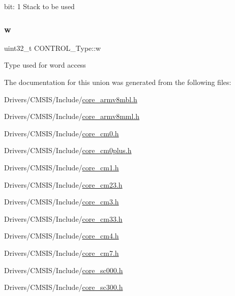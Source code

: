 bit\+: 1 Stack to be used \mbox{\label{union_c_o_n_t_r_o_l___type_a6b642cca3d96da660b1198c133ca2a1f}} 
\subsubsection{\texorpdfstring{w}{w}}
{\footnotesize\ttfamily uint32\+\_\+t C\+O\+N\+T\+R\+O\+L\+\_\+\+Type\+::w}

Type used for word access 

The documentation for this union was generated from the following files\+:\begin{DoxyCompactItemize}
\item 
Drivers/\+C\+M\+S\+I\+S/\+Include/\mbox{\hyperlink{core__armv8mbl_8h}{core\+\_\+armv8mbl.\+h}}\item 
Drivers/\+C\+M\+S\+I\+S/\+Include/\mbox{\hyperlink{core__armv8mml_8h}{core\+\_\+armv8mml.\+h}}\item 
Drivers/\+C\+M\+S\+I\+S/\+Include/\mbox{\hyperlink{core__cm0_8h}{core\+\_\+cm0.\+h}}\item 
Drivers/\+C\+M\+S\+I\+S/\+Include/\mbox{\hyperlink{core__cm0plus_8h}{core\+\_\+cm0plus.\+h}}\item 
Drivers/\+C\+M\+S\+I\+S/\+Include/\mbox{\hyperlink{core__cm1_8h}{core\+\_\+cm1.\+h}}\item 
Drivers/\+C\+M\+S\+I\+S/\+Include/\mbox{\hyperlink{core__cm23_8h}{core\+\_\+cm23.\+h}}\item 
Drivers/\+C\+M\+S\+I\+S/\+Include/\mbox{\hyperlink{core__cm3_8h}{core\+\_\+cm3.\+h}}\item 
Drivers/\+C\+M\+S\+I\+S/\+Include/\mbox{\hyperlink{core__cm33_8h}{core\+\_\+cm33.\+h}}\item 
Drivers/\+C\+M\+S\+I\+S/\+Include/\mbox{\hyperlink{core__cm4_8h}{core\+\_\+cm4.\+h}}\item 
Drivers/\+C\+M\+S\+I\+S/\+Include/\mbox{\hyperlink{core__cm7_8h}{core\+\_\+cm7.\+h}}\item 
Drivers/\+C\+M\+S\+I\+S/\+Include/\mbox{\hyperlink{core__sc000_8h}{core\+\_\+sc000.\+h}}\item 
Drivers/\+C\+M\+S\+I\+S/\+Include/\mbox{\hyperlink{core__sc300_8h}{core\+\_\+sc300.\+h}}\end{DoxyCompactItemize}
